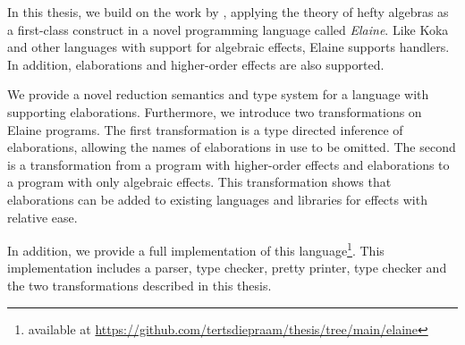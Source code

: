 In this thesis, we build on the work by \textcite{bach_poulsen_hefty_2023}, applying the theory of hefty algebras as a first-class construct in a novel programming language called \emph{Elaine}. Like Koka and other languages with support for algebraic effects, Elaine supports handlers. In addition, elaborations and higher-order effects are also supported.

We provide a novel reduction semantics and type system for a language with supporting elaborations. Furthermore, we introduce two transformations on Elaine programs. The first transformation is a type directed inference of elaborations, allowing the names of elaborations in use to be omitted. The second is a transformation from a program with higher-order effects and elaborations to a program with only algebraic effects. This transformation shows that elaborations can be added to existing languages and libraries for effects with relative ease.

In addition, we provide a full implementation of this language\footnote{available at \url{https://github.com/tertsdiepraam/thesis/tree/main/elaine}}. This implementation includes a parser, type checker, pretty printer, type checker and the two transformations described in this thesis.
